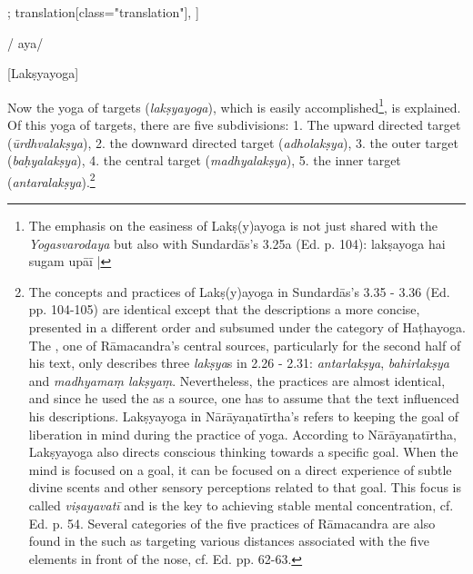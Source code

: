 \begin{alignment}[
  texts=edition[class="edition"];
  translation[class="translation"],
  ]
\begin{edition}
\begin{prose}
{  }/
aya/
    \end{prose}
  \end{edition}
  \begin{translation}
    \centerline{\textrm{\small{[Lakṣyayoga]}}}
    \bigskip
 \begin{tlate}
   Now the yoga of targets (\textit{lakṣyayoga}), which is easily accomplished\footnote{The emphasis on the easiness of Lakṣ(y)ayoga is not just shared with the \textit{Yogasvarodaya} but also with Sundardās's  3.25a (Ed. p. 104): lakṣayoga hai sugam upāī |}, is explained. Of this yoga of targets, there are five subdivisions:
   1. The upward directed target (\textit{ūrdhvalakṣya}),
   2. the downward directed target (\textit{adholakṣya}),
   3. the outer target (\textit{baḥyalakṣya}),
   4. the central target (\textit{madhyalakṣya}),
   5. the inner target (\textit{antaralakṣya}).\footnote{The concepts and practices of Lakṣ(y)ayoga in Sundardās's  3.35 - 3.36 (Ed. pp. 104-105) are identical except that the descriptions a more concise, presented in a different order and subsumed under the category of Haṭhayoga. The , one of Rāmacandra's central sources, particularly for the second half of his text, only describes three \textit{lakṣya}s in 2.26 - 2.31: \textit{antarlakṣya}, \textit{bahirlakṣya} and \textit{madhyamaṃ lakṣyaṃ}. Nevertheless, the practices are almost identical, and since he used the  as a source, one has to assume that the text influenced his descriptions. Lakṣyayoga in Nārāyaṇatīrtha's  refers to keeping the goal of liberation in mind during the practice of yoga. According to Nārāyaṇatīrtha, Lakṣyayoga also directs conscious thinking towards a specific goal. When the mind is focused on a goal, it can be focused on a direct experience of subtle divine scents and other sensory perceptions related to that goal. This focus is called \textit{viṣayavatī} and is the key to achieving stable mental concentration, cf. Ed. p. 54. Several categories of the five practices of Rāmacandra are also found in the  such as targeting various distances associated with the five elements in front of the nose, cf. Ed. pp. 62-63.}

\end{tlate}
\end{translation}
\end{alignment}
